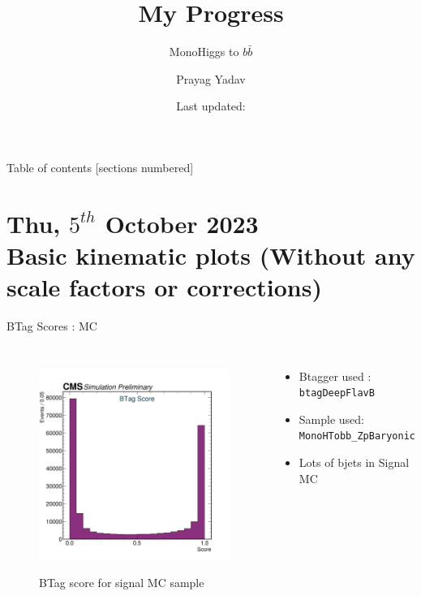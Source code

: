 \documentclass[10pt,xcolor=dvipsnames]{beamer}
\title{My Progress}
\subtitle{MonoHiggs to $b \bar{b}$}
\author{Prayag Yadav}
\institute{University of Hyderabad}
\date{Last updated: \DTMnow{}}
\begin{document}
\maketitle

\begin{frame}{Table of contents}
  [sections numbered]
  \tableofcontents%
\end{frame}

\section[Basic kinematic plots ]{\small{Thu, $5^{th}$ October 2023 } \\ Basic kinematic plots \tiny{(Without any scale factors or corrections)} }

  \begin{frame}[fragile]{BTag Scores : MC} 
    \begin{columns}
    \begin{figure} 
    \centering 
     \includegraphics[width=1\textwidth]{../Archive/KinemPlots/TagMC.png }
    \label{TagMC} 
    \caption{BTag score for signal MC sample}
    \end{figure} 
    \begin{itemize} 
    \raggedright 
    \small
    \item {Btagger used : \texttt{btagDeepFlavB}} 
    \item {Sample used: \texttt{MonoHTobb\_ZpBaryonic}} 
    \item Lots of bjets in Signal MC 
    \end{itemize}
    \end{columns} 
    \end{frame} 
    
\end{document}
